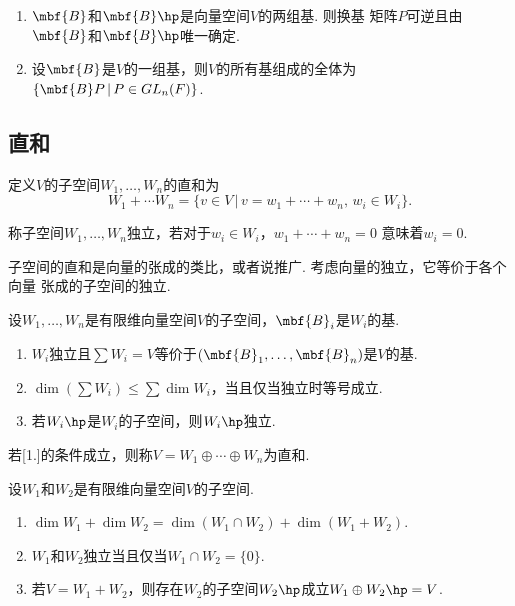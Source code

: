   \begin{pos}
    $\,$
    \begin{enumerate}
      \item $\mbf{B}$和$\mbf{B}\hp$是向量空间$V$的两组基. 则换基
        矩阵$P$可逆且由$\mbf{B}$和$\mbf{B}\hp$唯一确定.
      \item 设$\mbf{B}$是$V$的一组基，则$V$的所有基组成的全体为
        $\{\mbf{B}P\,|\, P\in GL_n(F)\}$.
    \end{enumerate}
  \end{pos}

\subsection{直和}

  \begin{defi}[直和]
    定义$V$的子空间$W_1,\dots,W_n$的直和为
    \[
      W_1 + \cdots W_n = \{v\in V\,|\, v=w_1+\cdots+w_n,\,w_i\in W_i\}.
    \]
  \end{defi}

  \begin{defi}[独立]
    称子空间$W_1,\dots,W_n$独立，若对于$w_i\in W_i$，$w_1+\cdots+w_n=0$
    意味着$w_i=0$.
  \end{defi}
  \remark
    子空间的直和是向量的张成的类比，或者说推广. 考虑向量的独立，它等价于各个向量
    张成的子空间的独立.

  \begin{pos}
    设$W_1,\dots,W_n$是有限维向量空间$V$的子空间，$\mbf{B}_i$是$W_i$的基.
    \begin{enumerate}
      \item $W_i$独立且$\sum W_i=V$等价于$(\mbf{B}_1,\dots,\mbf{B}_n)$是$V$的基.
      \item $\dim(\sum W_i)\le\sum\dim W_i$，当且仅当独立时等号成立.
      \item 若$W_i\hp$是$W_i$的子空间，则$W_i\hp$独立.
    \end{enumerate}
  \end{pos}
  \remark
    若[1.]的条件成立，则称$V=W_1\oplus\cdots\oplus W_n$为直和.

  \begin{thm}
    设$W_1$和$W_2$是有限维向量空间$V$的子空间.
    \begin{enumerate}
      \item $\dim W_1 + \dim W_2 = \dim(W_1\cap W_2)+\dim(W_1+W_2)$.
      \item $W_1$和$W_2$独立当且仅当$W_1\cap W_2=\{0\}$.
      \item 若$V=W_1+W_2$，则存在$W_2$的子空间$W_2\hp$成立$W_1\oplus W_2\hp=V$.
    \end{enumerate}
  \end{thm}
